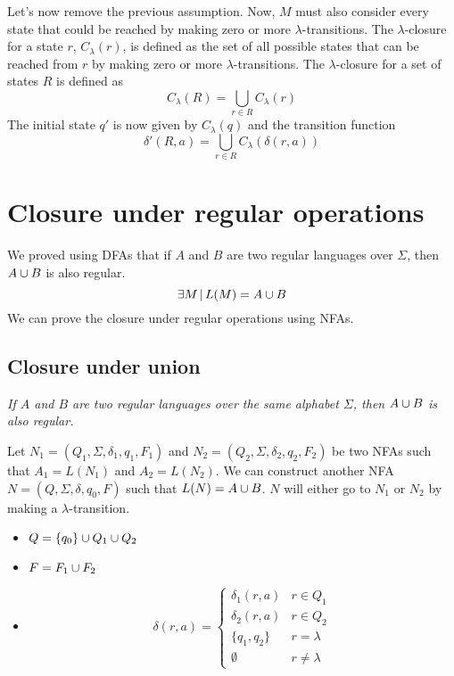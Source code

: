 \documentclass{article}
\newcommand{\emptyString}{\lambda}
\begin{document}
Let's now remove the previous assumption. Now, \(M\)
must also consider every state that could be reached by
making zero or more \(\emptyString\)-transitions.
The \(\emptyString\)-closure
for a state \(r\), \(C_\emptyString(r)\), is defined as
the set of all possible states that can be reached from \(r\) by making
zero or more \(\emptyString\)-transitions.
The \(\emptyString\)-closure for a set of states \(R\) is defined as
\[
    C_\emptyString(R) = \bigcup_{r\in R}C_\emptyString(r)
\]
The initial state \(q'\) is now given by \(C_\emptyString(q)\)
and the transition function
\[
    \delta'(R, a) = \bigcup_{r\in R}C_\emptyString(\delta(r, a))
\]

\section{Closure under regular operations}

We proved using DFAs that if \(A\) and \(B\) are two regular languages over \(\Sigma\), then \(A\cup B\)
is also regular.
\[
    \exists M \,|\, L(M) = A \cup B
\]
We can prove the closure under regular operations using NFAs.

\subsection{Closure under union}

\textit{If \(A\) and \(B\) are two regular languages over the same alphabet
\(\Sigma\), then \(A \cup B\) is also regular.}

Let \(N_1 = (Q_1, \Sigma, \delta_1, q_1, F_1)\) and
\(N_2 = (Q_2, \Sigma, \delta_2, q_2, F_2)\) be two NFAs such that
\(A_1 = L(N_1)\) and \(A_2 = L(N_2)\).
We can construct another NFA \(N=(Q, \Sigma, \delta, q_0, F)\)
such that \(L(N)=A\cup B\).
\(N\) will either go to \(N_1\) or \(N_2\) by making a \(\emptyString\)-transition.
\begin{itemize}
    \item \(Q=\{q_0\} \cup Q_1 \cup Q_2\)
    \item \(F=F_1 \cup F_2\)
    \item \[
        \delta(r, a) =
        \begin{cases}
            \delta_1(r, a) & r \in Q_1 \\
            \delta_2(r, a) & r \in Q_2 \\
            \{q_1, q_2\} & r = \emptyString \\
            \emptyset & r \neq \emptyString
        \end{cases}
    \]
\end{itemize}
\end{document}
